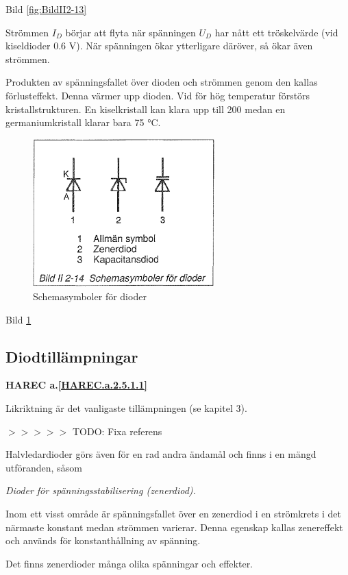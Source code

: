 Bild \ref{fig:BildII2-13}

Strömmen \(I_D\) börjar att flyta när spänningen \(U_D\) har nått ett
tröskelvärde (vid kiseldioder 0.6 V). När spänningen ökar ytterligare däröver,
så ökar även strömmen.

Produkten av spänningsfallet över dioden och strömmen genom den kallas
förlusteffekt. Denna värmer upp dioden. Vid för hög temperatur förstörs
kristallstrukturen. En kiselkristall kan klara upp till 200 medan en
germaniumkristall klarar bara 75 °C.

\begin{figure}[h]
\begin{center}
\includegraphics[width=7cm]{images/bild_2_2-14}
\caption{Schemasymboler för dioder}
\label{fig:BildII2-14}
\end{center}
\end{figure}

Bild \ref{fig:BildII2-14}

\subsection{Diodtillämpningar}
\textbf{HAREC a.\ref{HAREC.a.2.5.1.1}\label{myHAREC.a.2.5.1.1}}

Likriktning är det vanligaste tillämpningen (se kapitel 3).

$>>>>>$ TODO: Fixa referens

Halvledardioder görs även för en rad andra ändamål och finns i en mängd
utföranden, såsom

\emph{Dioder för spänningsstabilisering (zenerdiod).}

  Inom ett visst område är spänningsfallet över en zenerdiod i en strömkrets
  i det närmaste konstant medan strömmen varierar. Denna egenskap kallas
  zenereffekt och används för konstanthållning av spänning.

  Det finns zenerdioder många olika spänningar och effekter.


